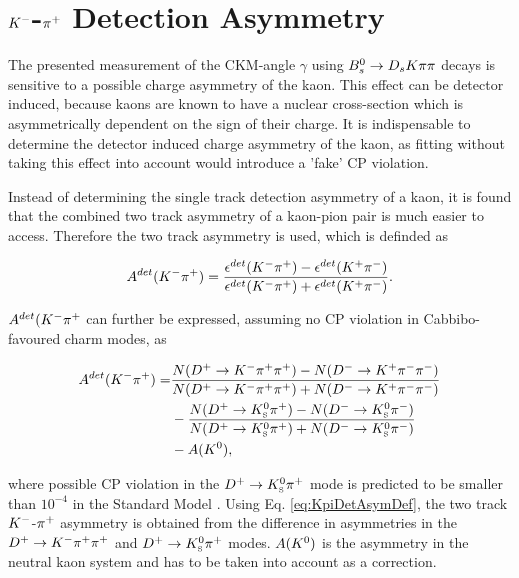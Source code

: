 \section{${{K}^-}$-${{\pi}^+}$ Detection Asymmetry}
\label{sec:KpiAsym}

The presented measurement of the CKM-angle $\gamma$ using ${{B}^0_{s}}\rightarrow{\ensuremath{{D}_{s}}}{\ensuremath{K}}{\ensuremath{\pi}}{\ensuremath{\pi}}$ decays is sensitive to a possible charge asymmetry of the kaon. 
This effect can be detector induced, because kaons are known to have a nuclear cross-section which is asymmetrically dependent on the sign of their charge. 
It is indispensable to determine the detector induced charge asymmetry of the kaon, as fitting without taking this effect into account would introduce a 'fake' CP violation. \newline

Instead of determining the single track detection asymmetry of a kaon, it is found \cite{Gordon:1482647} that the combined two track asymmetry of a kaon-pion pair is much easier to access. 
Therefore the two track asymmetry is used, which is definded as 
   

\begin{equation}
A^{det}(\Km\pip) = \frac{\epsilon^{det}(\Km\pip) -\epsilon^{det}(\Kp\pim)}{\epsilon^{det}(\Km\pip) + \epsilon^{det}(\Kp\pim)}.
\label{eq:KpiDetAsymDef}
\end{equation}


$A^{det}({{K}^-}{{\pi}^+}$ can further be expressed, assuming no CP violation in Cabbibo-favoured charm modes, as \cite{Davis:2310213}

\begin{equation}
\begin{split}
A^{det}(\Km\pip) = & \frac{N(\Dp\to\Km\pip\pip) - N(\Dm\to\Kp\pim\pim)}{N(\Dp\to\Km\pip\pip) + N(\Dm\to\Kp\pim\pim)} \\
                  & - \frac{N(\Dp\to\KS\pip) - N(\Dm\to\KS\pim)}{N(\Dp\to\KS\pip) + N(\Dm\to\KS\pim)} \\
                  & - A(\Kz),
\end{split}
\label{eq:KpiDetAsymDef}
\end{equation}

where possible CP violation in the ${{D}^+}\rightarrow{\ensuremath{{K}^0_{\mathrm{ \scriptscriptstyle S}}}}{\ensuremath{{\pi}^+}}$ mode is predicted to be smaller than $10^{-4}$ in the Standard Model \cite{Bigi:1994aw}.
Using Eq. \ref{eq:KpiDetAsymDef}, the two track ${{K}^-}$-${{\pi}^+}$ asymmetry is obtained from the difference in asymmetries in the ${{D}^+}\rightarrow{\ensuremath{{K}^-}}{\ensuremath{{\pi}^+}}{\ensuremath{{\pi}^+}}$ and ${{D}^+}\rightarrow{\ensuremath{{K}^0_{\mathrm{ \scriptscriptstyle S}}}}{\ensuremath{{\pi}^+}}$ modes. 
$A({{K}^0})$ is the asymmetry in the neutral kaon system and has to be taken into account as a correction. \newline

